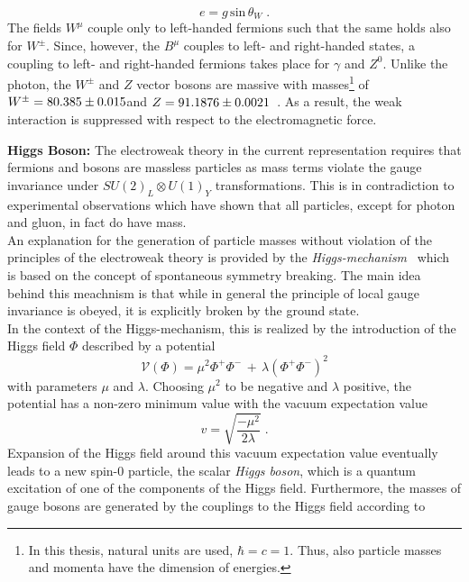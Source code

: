 \begin{description}
\begin{equation}
e = g \, \mathrm{sin} \, \theta_{W} \; .
\end{equation}
The fields $W^{\mu}$ couple only to left-handed fermions such that the same holds also for $W^{\pm}$. Since, however, the $B^{\mu}$ couples to left- and right-handed states, a coupling to left- and right-handed fermions takes place for $\gamma$ and $Z^0$. Unlike the photon, the $W^{\pm}$ and $Z$ vector bosons are massive with masses\footnote{In this thesis, natural units are used, \ie $\hbar = c =1$. Thus, also particle masses and momenta have the dimension of energies.} of $W^{\pm} = 80.385 \pm 0.015$\gev and $Z = 91.1876 \pm 0.0021$\gev~\cite{Agashe:2014kda}. As a result, the weak interaction is suppressed with respect to the electromagnetic force. 
\item \textbf{Higgs Boson:} The electroweak theory in the current representation requires that fermions and bosons are massless particles as mass terms violate the gauge invariance under $SU(2)_{L} \otimes U(1)_{Y}$ transformations. This is in contradiction to experimental observations which have shown that all particles, except for photon and gluon, in fact do have mass. \\
An explanation for the generation of particle masses without violation of the principles of the electroweak theory is provided by the \textit{Higgs-mechanism}~\cite{PhysRevLett.13.508, PhysRevLett.13.321, PhysRevLett.13.585} which is based on the concept of spontaneous symmetry breaking. The main idea behind this meachnism is that while in general the principle of local gauge invariance is obeyed, it is explicitly broken by the ground state. \\
In the context of the Higgs-mechanism, this is realized by the introduction of the Higgs field $\Phi$ described by a potential 
\begin{equation*}
\mathcal{V}(\Phi) = \mu^2 \Phi^+\Phi^- \, + \, \lambda (\Phi^+\Phi^-)^2
\end{equation*}
with parameters $\mu$ and $\lambda$. Choosing $\mu^2$ to be negative and $\lambda$ positive, the potential has a non-zero minimum value with the vacuum expectation value
\begin{equation*}
v = \sqrt{\frac{-\mu^2}{2\lambda}} \; .
\end{equation*}
Expansion of the Higgs field around this vacuum expectation value eventually leads to a new spin-0 particle, the scalar \textit{Higgs boson}, which is a quantum excitation of one of the components of the Higgs field. Furthermore, the masses of gauge bosons are generated by the couplings to the Higgs field according to

\end{description}
